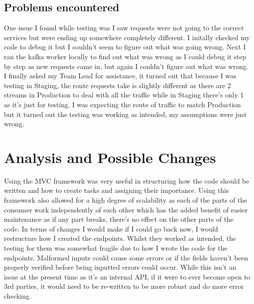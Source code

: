 \subsection{Problems encountered}
One issue I found while testing was I saw requests were not going to the correct services but were ending up somewhere completely different.  I initally checked my code to debug it but I couldn't seem to figure out what was going wrong.  Next I ran the kafka worker locally to find out what was wrong as I could debug it step by step as new requests came in, but again I couldn't figure out what was wrong.  I finally asked my Team Lead for assistance,  it turned out that because I was testing in Staging,  the route requests take is slightly different as there are 2 streams in Production to deal with all the traffic while in Staging there's only 1 as it's just for testing.  I was expecting the route of traffic to match Production but it turned out the testing was working as intended,  my assumptions were just wrong. 

\section{Analysis and Possible Changes}
Using the MVC framework was very useful in structuring how the code should be written and how to create tasks and assigning their importance.  Using this framework also allowed for a high degree of scalability as each of the parts of the consumer work independently of each other which has the added benefit of easier maintenance as if any part breaks, there's no effect on the other parts of the code.  \newline In terms of changes I would make if I could go back now, I would restructure how I created the endpoints.  Whilst they worked as intended, the testing for them was somewhat fragile due to how I wrote the code for the endpoints.  Malformed inputs could cause some errors or if the fields haven't been properly verified before being inputted errors could occur.  While this isn't an issue at the present time as it's an internal API,  if it were to ever become open to 3rd parties,  it would need to be re-written to be more robust and do more error checking.